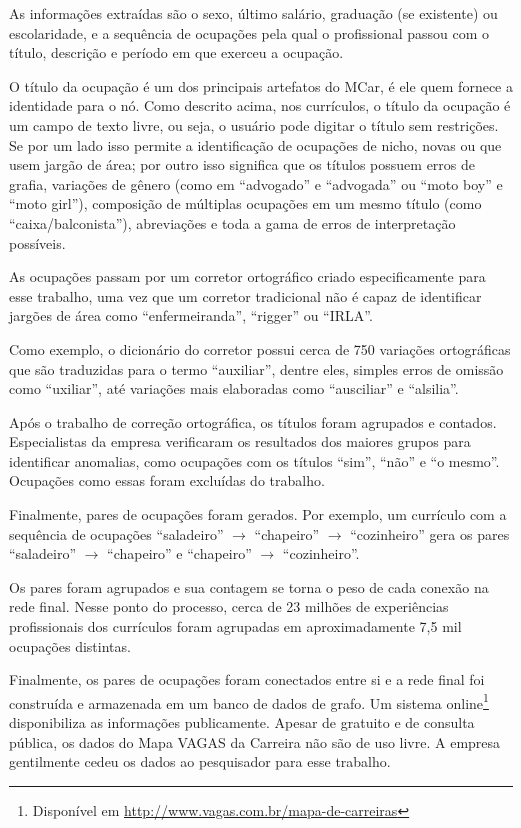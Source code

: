 \documentclass[
  article,
  11pt,
  a4paper,
  english,
  brazil,
  sumario=tradicional]{abntex2}
\begin{document}
As informações extraídas são o sexo, último salário, graduação (se existente) ou escolaridade, e a sequência de ocupações pela qual o profissional passou com o título, descrição e período em que exerceu a ocupação.

O título da ocupação é um dos principais artefatos do MCar, é ele quem fornece a identidade para o nó. Como descrito acima, nos currículos, o título da ocupação é um campo de texto livre, ou seja, o usuário pode digitar o título sem restrições. Se por um lado isso permite a identificação de ocupações de nicho, novas ou que usem jargão de área; por outro isso significa que os títulos possuem erros de grafia, variações de gênero (como em \enquote{advogado} e \enquote{advogada} ou \enquote{moto boy} e \enquote{moto girl}), composição de múltiplas ocupações em um mesmo título (como \enquote{caixa/balconista}), abreviações e toda a gama de erros de interpretação possíveis.

As ocupações passam por um corretor ortográfico criado especificamente para esse trabalho, uma vez que um corretor tradicional não é capaz de identificar jargões de área como \enquote{enfermeiranda}, \enquote{rigger} ou \enquote{IRLA}.

Como exemplo, o dicionário do corretor possui cerca de 750 variações ortográficas que são traduzidas para o termo \enquote{auxiliar}, dentre eles, simples erros de omissão como \enquote{uxiliar}, até variações mais elaboradas como \enquote{ausciliar} e \enquote{alsilia}.

Após o trabalho de correção ortográfica, os títulos foram agrupados e contados. Especialistas da empresa verificaram os resultados dos maiores grupos para identificar anomalias, como ocupações com os títulos \enquote{sim}, \enquote{não} e \enquote{o mesmo}. Ocupações como essas foram excluídas do trabalho.

Finalmente, pares de ocupações foram gerados. Por exemplo, um currículo com a sequência de ocupações \enquote{saladeiro} $\to$ \enquote{chapeiro} $\to$ \enquote{cozinheiro} gera os pares \enquote{saladeiro} $\to$ \enquote{chapeiro} e \enquote{chapeiro} $\to$ \enquote{cozinheiro}.

Os pares foram agrupados e sua contagem se torna o peso de cada conexão na rede final. Nesse ponto do processo, cerca de 23 milhões de experiências profissionais dos currículos foram agrupadas em aproximadamente 7,5 mil ocupações distintas.

Finalmente, os pares de ocupações foram conectados entre si e a rede final foi construída e armazenada em um banco de dados de grafo. Um sistema online\footnote{Disponível em \url{http://www.vagas.com.br/mapa-de-carreiras}} disponibiliza as informações publicamente. Apesar de gratuito e de consulta pública, os dados do Mapa VAGAS da Carreira não são de uso livre. A empresa gentilmente cedeu os dados ao pesquisador para esse trabalho.
\end{document}
